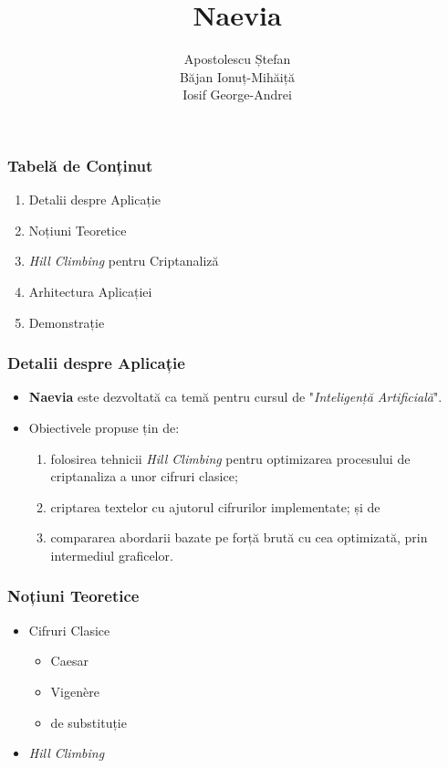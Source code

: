 \documentclass[xcolor={table}]{beamer}
\title{Naevia}
\author{%
    Apostolescu Ștefan \\
    Băjan Ionuț-Mihăiță \\
    Iosif George-Andrei
}
\begin{document}
    \setcounter{showProgressBar}{0}
	\setcounter{showSlideNumbers}{0}
	\frame{\titlepage}

	\begin{frame}
		\large{\frametitle{Tabelă de Conținut}}
		\begin{enumerate}
			\item Detalii despre Aplicație
			\item Noțiuni Teoretice
			\item \textit{Hill Climbing} pentru Criptanaliză
			\item Arhitectura Aplicației
			\item Demonstrație
		\end{enumerate}
	\end{frame}

	\setcounter{framenumber}{0}
	\setcounter{showProgressBar}{1}
	\setcounter{showSlideNumbers}{1}

	\begin{frame}
		\frametitle{Detalii despre Aplicație} \pause
		\begin{itemize}
			\item \textbf{Naevia} este dezvoltată ca temă pentru cursul de "\textit{Inteligență Artificială}". \pause
			\item Obiectivele propuse țin de: \pause
			    \begin{enumerate}
                    \item folosirea tehnicii \textit{Hill Climbing} pentru optimizarea procesului de criptanaliza a unor cifruri clasice; \pause
                    \item criptarea textelor cu ajutorul cifrurilor implementate; și de \pause
                    \item compararea abordarii bazate pe forță brută cu cea optimizată, prin intermediul graficelor.
                \end{enumerate}
		\end{itemize}
	\end{frame}
	
	\begin{frame}
		\frametitle{Noțiuni Teoretice} \pause
		\begin{itemize}
			\item Cifruri Clasice \pause
			    \begin{itemize}
			        \item Caesar \pause
			        \item Vigenère \pause
			        \item de substituție \pause
			    \end{itemize}
			\item \textit{Hill Climbing}
		\end{itemize}
	\end{frame}
	
\end{document}
